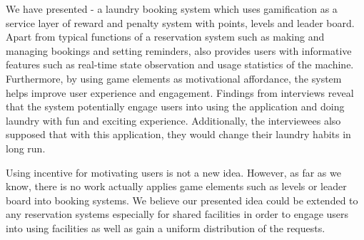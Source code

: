 We have presented {\toolname} - a laundry booking system which uses gamification as a service layer of reward and penalty system with points, levels and leader board. Apart from typical functions of a reservation system such as making and managing bookings and setting reminders, {\toolname} also provides users with informative features such as real-time state observation and usage statistics of the machine. Furthermore, by using game elements as motivational affordance, the system helps improve user experience and engagement. Findings from interviews reveal that the system potentially engage users into using the application and doing laundry with fun and exciting experience. Additionally, the interviewees also supposed that with this application, they would change their laundry habits in long run.

Using incentive for motivating users is not a new idea. However, as far as we know, there is no work actually applies game elements such as levels or leader board into booking systems. We believe our presented idea could be extended to any reservation systems especially for shared facilities in order to engage users into using facilities as well as gain a uniform distribution of the requests.